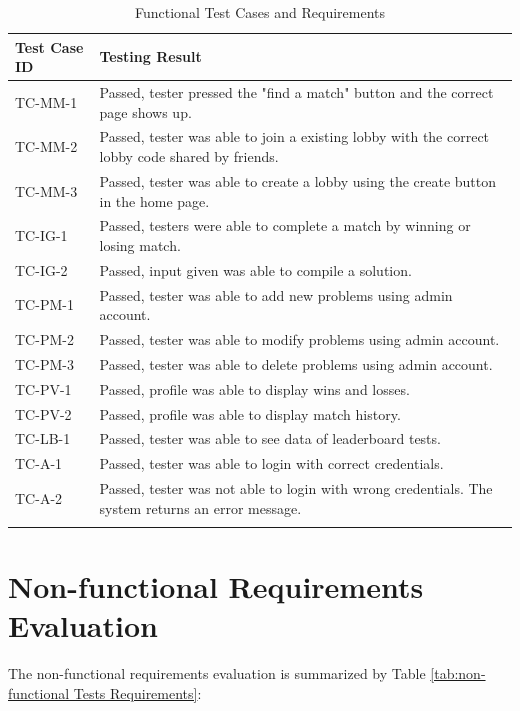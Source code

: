 \documentclass[12pt, titlepage]{article}
\begin{document}
\begin{longtable}{| p{2.5cm} | p{11cm} |}
    \hline
    Test Case ID & Testing Result\\
    \hline
    TC-MM-1 & Passed, tester pressed the "find a match" button and the correct page shows up.\\
    \hline
    TC-MM-2 & Passed, tester was able to join a existing lobby with the correct lobby code shared by friends. \\ 
     \hline
    TC-MM-3 & Passed, tester was able to create a lobby using the create button in the home page.\\
     \hline
    TC-IG-1 & Passed, testers were able to complete a match by winning or losing match.\\
     \hline
    TC-IG-2 & Passed, input given was able to compile a solution.\\
     \hline
    TC-PM-1 & Passed, tester was able to add new problems using admin account.\\
     \hline
    TC-PM-2 & Passed, tester was able to modify problems using admin account.\\
     \hline
    TC-PM-3 & Passed, tester was able to delete problems using admin account.\\
     \hline
    TC-PV-1 & Passed, profile was able to display wins and losses.\\
     \hline
    TC-PV-2 & Passed, profile was able to display match history.\\
     \hline
    TC-LB-1 & Passed, tester was able to see data of leaderboard tests.\\
     \hline
     TC-A-1 & Passed, tester was able to login with correct credentials.\\
     \hline
     TC-A-2 & Passed, tester was not able to login with wrong credentials. The system returns an error message.\\
     \hline
    \caption{Functional Test Cases and Requirements}
    \label{tab:functional Tests Requirements}
\end{longtable}


\section{Non-functional Requirements Evaluation}
The non-functional requirements evaluation is summarized by Table \ref{tab:non-functional Tests Requirements}:
\end{document}
